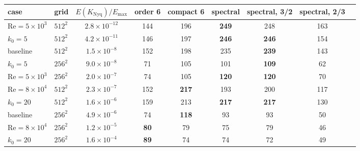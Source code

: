 \documentclass[11pt,a4paper]{article}
\newcommand{\Rey}{\mathrm{Re}}
\begin{document}
\begin{center}\small
\setlength{\tabcolsep}{4pt}
\begin{tabular}{llccccccc}
\toprule
case & grid & $E(K_{\mathrm{Nyq}})/E_{\max}$ & order 6 & compact 6 & spectral & spectral, 3/2 & spectral, 2/3 \\
\midrule
$\Rey=5\times10^3$ & $512^2$ & $2.8\times10^{-12}$ & 144 & 196 & \textbf{249} & 248 & 163 \\
$k_0=5$ & $512^2$ & $4.2\times10^{-11}$ & 146 & 197 & \textbf{246} & \textbf{246} & 154 \\
baseline & $512^2$ & $1.5\times10^{-8}$ & 152 & 198 & 235 & \textbf{239} & 143 \\
$k_0=5$ & $256^2$ & $9.0\times10^{-8}$ & 71 & 105 & 101 & \textbf{109} & 62 \\
$\Rey=5\times10^3$ & $256^2$ & $2.0\times10^{-7}$ & 74 & 105 & \textbf{120} & \textbf{120} & 70 \\
$\Rey=8\times10^4$ & $512^2$ & $2.3\times10^{-7}$ & 152 & \textbf{217} & 193 & 200 & 117 \\
$k_0=20$ & $512^2$ & $1.6\times10^{-6}$ & 159 & 213 & \textbf{217} & \textbf{217} & 130 \\
baseline & $256^2$ & $4.9\times10^{-6}$ & 74 & \textbf{118} & 93 & 93 & 50 \\
$\Rey=8\times10^4$ & $256^2$ & $1.2\times10^{-5}$ & \textbf{80} & 79 & 75 & 79 & 46 \\
$k_0=20$ & $256^2$ & $1.6\times10^{-4}$ & \textbf{89} & 74 & 74 & 72 & 49 \\
\bottomrule
\end{tabular}
\end{center}
\end{document}
